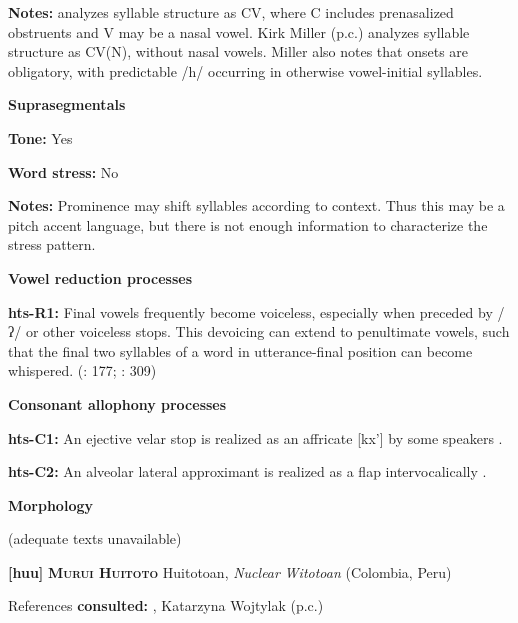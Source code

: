 \textbf{Notes:} \citet{Sands2013} analyzes syllable structure as CV, where C includes prenasalized obstruents and V may be a nasal vowel. Kirk Miller (p.c.) analyzes syllable structure as CV(N), without nasal vowels. Miller also notes that onsets are obligatory, with predictable /h/ occurring in otherwise vowel-initial syllables.



\textbf{Suprasegmentals}



\textbf{Tone:} Yes



\textbf{Word stress:} No



\textbf{Notes:} Prominence may shift syllables according to context. Thus this may be a pitch accent language, but there is not enough information to characterize the stress pattern.



\textbf{Vowel reduction processes}



\textbf{hts-R1:} Final vowels frequently become voiceless, especially when preceded by /ʔ/ or other voiceless stops. This devoicing can extend to penultimate vowels, such that the final two syllables of a word in utterance-final position can become whispered. (\citealt{SandsEtAl1996}: 177; \citealt{TuckerEtAl1977}: 309)



\textbf{Consonant allophony processes}



\textbf{hts-C1:} An ejective velar stop is realized as an affricate [kx’] by some speakers \citep[41]{Sands2013}.



\textbf{hts-C2:} An alveolar lateral approximant is realized as a flap intervocalically \citep[41]{Sands2013}.



\textbf{Morphology}



(adequate texts unavailable)



\textbf{[huu]}   \textbf{\textsc{Murui Huitoto}  }  Huitotoan, \textit{Nuclear} \textit{Witotoan} (Colombia, Peru)



References \textbf{consulted:} \citet{Wojtylak2017}, Katarzyna Wojtylak (p.c.)



